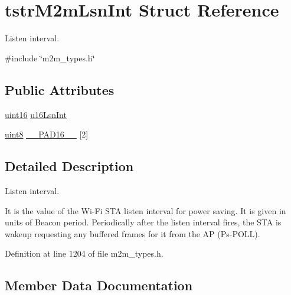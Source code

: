 \hypertarget{structtstrM2mLsnInt}{}\section{tstr\+M2m\+Lsn\+Int Struct Reference}
\label{structtstrM2mLsnInt}


Listen interval.  




{\ttfamily \#include \char`\"{}m2m\+\_\+types.\+h\char`\"{}}

\subsection*{Public Attributes}
\begin{DoxyCompactItemize}
\item 
\hyperlink{group__DataT_ga1daa745171fc6e31d942c161422a76f9}{uint16} \hyperlink{structtstrM2mLsnInt_a98178fb9e7382eacae7995daff8396a1}{u16\+Lsn\+Int}
\item 
\hyperlink{group__DataT_ga4df709a77647e870bbf1d955b8edc9a6}{uint8} \hyperlink{structtstrM2mLsnInt_a062ae81a194983866dddb926a3b753da}{\+\_\+\+\_\+\+P\+A\+D16\+\_\+\+\_\+} \mbox{[}2\mbox{]}
\end{DoxyCompactItemize}


\subsection{Detailed Description}
Listen interval. 

It is the value of the Wi-\/\+Fi S\+TA listen interval for power saving. It is given in units of Beacon period. Periodically after the listen interval fires, the S\+TA is wakeup requesting any buffered frames for it from the AP (Ps-\/\+P\+O\+LL). 

Definition at line 1204 of file m2m\+\_\+types.\+h.



\subsection{Member Data Documentation}
\mbox{\label{structtstrM2mLsnInt_a062ae81a194983866dddb926a3b753da}} 
